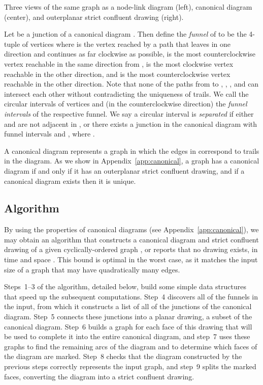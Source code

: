 \documentclass{llncs}
\begin{document}
 {Three views of the same graph as a node-link diagram (left), canonical diagram (center), and outerplanar strict confluent drawing (right).}

Let  be a junction of a canonical diagram . Then
define the \emph{funnel} of  to be the 4-tuple of vertices  where 
is the vertex reached by a path that leaves  in one direction and
continues as far clockwise as possible,  is the most counterclockwise
vertex reachable in the same direction from ,  is the most clockwise
vertex reachable in the other direction, and  is the most
counterclockwise vertex reachable in the other direction. Note that
none of the paths from  to , , , and  can intersect each other without contradicting the uniqueness of trails. We call the circular intervals of vertices  and  (in the counterclockwise direction) the \emph{funnel intervals} of the respective funnel. We say a circular interval  is \emph{separated} if either  and  are not adjacent in , or there exists a junction in the canonical diagram with funnel intervals  and , where .

A canonical diagram represents a graph  in which the edges in  correspond to trails in the diagram. As we show in Appendix~\ref {app:canonical}, a graph  has a canonical diagram if and only if it has an outerplanar strict confluent drawing, and if a canonical diagram exists then it is unique.

\subsection{Algorithm}

By using the properties of canonical diagrams (see Appendix~\ref{app:canonical}), we may obtain an algorithm that constructs a canonical diagram and strict confluent drawing of a given cyclically-ordered graph , or reports that no drawing exists, in time and space . This bound is optimal in the worst case, as it matches the input size of a graph that may have quadratically many edges.

Steps~1--3 of the algorithm, detailed below, build some simple data structures that speed up the subsequent computations. Step~4 discovers all of the funnels in the input, from which it constructs a list of all of the junctions of the canonical diagram. Step~5 connects these junctions into a planar drawing, a subset of the canonical diagram. Step~6 builds a graph for each face of this drawing that will be used to complete it into the entire canonical diagram, and step~7 uses these graphs to find the remaining arcs of the diagram and to determine which faces of the diagram are marked. Step~8 checks that the diagram constructed by the previous steps correctly represents the input graph, and step~9 splits the marked faces, converting the diagram into a strict confluent drawing.
\end{document}
